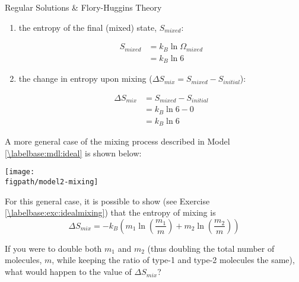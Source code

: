 \begin{activity}{Regular Solutions \& Flory-Huggins Theory}
\begin{ctqs}
\begin{enumerate}
			\item the entropy of the final (mixed) state, $S_{mixed}$:
			
				\begin{solution}[0.75in]
					\begin{align*}
						S_{mixed} &= k_B\ln\Omega_{mixed} \\
							&= k_B \ln 6
					\end{align*}
				\end{solution}
				
			\item the change in entropy upon mixing ($\Delta S_{mix} = S_{mixed} - S_{initial}$): 
			
				\begin{solution}[0.75in]
					\begin{align*}
						\Delta S_{mix} &= S_{mixed} - S_{initial} \\
							&= k_B \ln 6 - 0\\
							&= k_B \ln 6
					\end{align*}
				\end{solution}
				
		\end{enumerate}
		
\end{ctqs}

\begin{infobox}

	A more general case of the mixing process described in Model \ref{\labelbase:mdl:ideal} is shown below:
	
	\centerline{\texttt{[image: \\figpath/model2-mixing]}}
	
	For this general case, it is possible to show (see Exercise \ref{\labelbase:exc:idealmixing}) that the entropy of mixing is 
	\begin{equation*}
		\Delta S_{mix} = -k_B\left(m_1 \ln\left(\frac{m_1}{m}\right) + m_2 \ln\left(\frac{m_2}{m}\right) \right) \label{\labelbase:eqn:idealS}
	\end{equation*}
\end{infobox}

\begin{ctqs}

	\question If you were to double both $m_1$ and $m_2$ (thus doubling the total number of molecules, $m$, while keeping the ratio of type-1 and type-2 molecules the same), what would happen to the value of $\Delta S_{mix}$?
	
		\begin{solution}[1in]
		

\end{solution}
\end{ctqs}
\end{activity}
